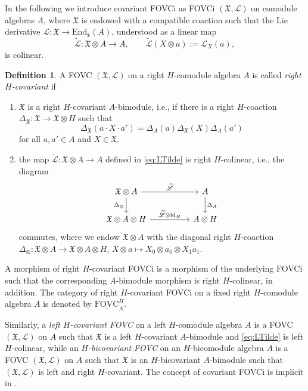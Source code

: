 \documentclass{article}
\theoremstyle{definition}
\newtheorem{definition}[thm]{Definition}
\begin{document}
	
	In the following we introduce covariant FOVCi as FOVCi $(\mathfrak{X},\mathscr{L})$ on comodule algebras $A$, where $\mathfrak{X}$ is endowed with a compatible coaction such that the Lie derivative $\mathscr{L}\colon\mathfrak{X}\to\mathrm{End}_\Bbbk(A)$, understood as a linear map
	\begin{equation}\label{eq:LTilde}
		\widetilde{\mathscr{L}}\colon\mathfrak{X}\otimes A\to A,\qquad\widetilde{\mathscr{L}}(X\otimes a):=\mathscr{L}_X(a),
	\end{equation}
	is colinear.
	\begin{definition}\label{def:covFOVC}
		A FOVC $(\mathfrak{X},\mathscr{L})$ on a right $H$-comodule algebra $A$ is called \textit{right $H$-covariant} if
		\begin{enumerate}
			\item[i.)] {$\mathfrak{X}$ is a right $H$-covariant $A$-bimodule, i.e., if there is a right $H$-coaction $\Delta_{\mathfrak{X}}\colon\mathfrak{X}\to\mathfrak{X}\otimes H$ such that
				$$
				\Delta_{\mathfrak{X}}(a\cdot X\cdot a')=\Delta_A(a)\Delta_{\mathfrak{X}}(X)\Delta_A(a')
				$$
				for all $a,a'\in A$ and $X\in\mathfrak{X}$.}
			
			\item[ii.)] the map $\widetilde{\mathscr{L}}\colon\mathfrak{X}\otimes A\to A$ defined in \eqref{eq:LTilde} is right $H$-colinear, i.e., the diagram
			\begin{equation}\label{diagLcov}
				\begin{tikzcd}
					\mathfrak{X}\otimes A \arrow{rr}{\widetilde{\mathscr{L}}} \arrow{d}[swap]{\Delta_\otimes}
					& & A \arrow{d}{\Delta_A}\\
					\mathfrak{X}\otimes A\otimes H \arrow{rr}{\widetilde{\mathscr{L}}\otimes\mathrm{id}_H}
					& & A\otimes H
				\end{tikzcd}
			\end{equation}
			commutes, where we endow $\mathfrak{X}\otimes A$ with the diagonal right $H$-coaction $\Delta_\otimes\colon\mathfrak{X}\otimes A\to\mathfrak{X}\otimes A\otimes H$, $X\otimes a\mapsto X_0\otimes a_0\otimes X_1a_1$.
		\end{enumerate}
		A morphism of right $H$-covariant FOVCi is a morphism of the underlying FOVCi such that the corresponding $A$-bimodule morphism is right $H$-colinear, in addition.
		The category of right $H$-covariant FOVCi on a fixed right $H$-comodule algebra $A$ is denoted by $\underline{\mathrm{FOVC}}_A^H$.
		
		
	\end{definition}
	Similarly, a \textit{left $H$-covariant FOVC} on a left $H$-comodule algebra $A$ is a FOVC $(\mathfrak{X},\mathscr{L})$ on $A$ such that $\mathfrak{X}$ is a left $H$-covariant $A$-bimodule and \eqref{eq:LTilde} is left $H$-colinear, while an \textit{$H$-bicovariant FOVC} on an $H$-bicomodule algebra $A$ is a FOVC $(\mathfrak{X},\mathscr{L})$ on $A$ such that $\mathfrak{X}$ is an $H$-bicovariant $A$-bimodule such that $(\mathfrak{X},\mathscr{L})$ is left and right $H$-covariant. The concept of covariant FOVCi is implicit in \cite{BMvector}.
	
\end{document}
